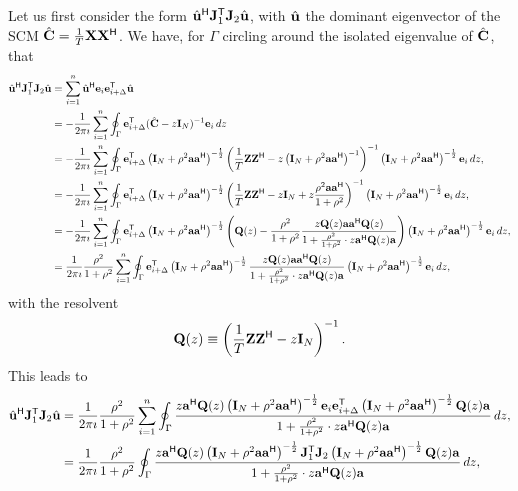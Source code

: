 \documentclass[11pt,a4paper]{article}
\begin{document}
Let us first consider the form $\hat {\mathbf{u}}^{\sf H} {\mathbf{J}}_1^{\sf T} {\mathbf{J}}_2 \hat {\mathbf{u}}$, with $\hat {\mathbf{u}}$ the dominant eigenvector of the SCM $\hat {{\mathbf{C}}} = \frac1T {\mathbf{X}} {\mathbf{X}}^{\sf H}$.
We have, for $\Gamma$ circling around the isolated eigenvalue of $\hat {{\mathbf{C}}}$, that
\begin{align*}
		\hat {\mathbf{u}}^{\sf H} {\mathbf{J}}_1^{\sf T} {\mathbf{J}}_2 \hat {\mathbf{u}} &= \sum_{i=1}^n \hat {\mathbf{u}}^{\sf H} \mathbf{e}_{i} \mathbf{e}_{i + \Delta}^{\sf T} \hat {\mathbf{u}} \\ 
		&= -\frac1{2 \pi \imath} \sum_{i=1}^n \oint_{\Gamma} \mathbf{e}_{i + \Delta}^{\sf T} ( \hat {{\mathbf{C}}} - z \mathbf{I}_N )^{-1} \mathbf{e}_{i}\,dz \\ 
		&= -\frac1{2 \pi \imath} \sum_{i=1}^n \oint_{\Gamma} \mathbf{e}_{i + \Delta}^{\sf T} \left(\mathbf{I}_N + \rho^2 \mathbf{a} \mathbf{a}^{\sf H} \right)^{-\frac12} \left( \frac1T {\mathbf{Z}} {\mathbf{Z}}^{\sf H} - z  \left(\mathbf{I}_N + \rho^2 \mathbf{a} \mathbf{a}^{\sf H} \right)^{-1} \right)^{-1} \left(\mathbf{I}_N + \rho^2 \mathbf{a} \mathbf{a}^{\sf H} \right)^{-\frac12} \mathbf{e}_{i}\,dz, \\ 
		&= -\frac1{2 \pi \imath} \sum_{i=1}^n \oint_{\Gamma} \mathbf{e}_{i + \Delta}^{\sf T} \left(\mathbf{I}_N + \rho^2 \mathbf{a} \mathbf{a}^{\sf H} \right)^{-\frac12} \left( \frac1T {\mathbf{Z}} {\mathbf{Z}}^{\sf H} - z \mathbf{I}_N + z \frac{ \rho^2 \mathbf{a} \mathbf{a}^{\sf H} }{1 + \rho^2} \right)^{-1} \left(\mathbf{I}_N + \rho^2 \mathbf{a} \mathbf{a}^{\sf H} \right)^{-\frac12} \mathbf{e}_{i}\,dz, \\ 
		&= -\frac1{2 \pi \imath} \sum_{i=1}^n \oint_{\Gamma} \mathbf{e}_{i + \Delta}^{\sf T} \left(\mathbf{I}_N + \rho^2 \mathbf{a} \mathbf{a}^{\sf H} \right)^{-\frac12} \left( {\mathbf{Q}}(z) -  \frac{ \rho^2 }{1 + \rho^2} \frac{z {\mathbf{Q}}(z) \mathbf{a} \mathbf{a}^{\sf H} {\mathbf{Q}}(z)}{ 1 + \frac{ \rho^2 }{1 + \rho^2} \cdot z \mathbf{a}^{\sf H} {\mathbf{Q}}(z) \mathbf{a} } \right) \left(\mathbf{I}_N + \rho^2 \mathbf{a} \mathbf{a}^{\sf H} \right)^{-\frac12} \mathbf{e}_{i}\,dz, \\ 
		&= \frac1{2 \pi \imath} \frac{ \rho^2 }{1 + \rho^2} \sum_{i=1}^n \oint_{\Gamma} \mathbf{e}_{i + \Delta}^{\sf T} \left(\mathbf{I}_N + \rho^2 \mathbf{a} \mathbf{a}^{\sf H} \right)^{-\frac12} \frac{z {\mathbf{Q}}(z) \mathbf{a} \mathbf{a}^{\sf H} {\mathbf{Q}}(z)}{ 1 + \frac{ \rho^2 }{1 + \rho^2} \cdot z \mathbf{a}^{\sf H} {\mathbf{Q}}(z) \mathbf{a} } \left(\mathbf{I}_N + \rho^2 \mathbf{a} \mathbf{a}^{\sf H} \right)^{-\frac12} \mathbf{e}_{i}\,dz,
\end{align*}
with the resolvent
\begin{equation}
	{\mathbf{Q}}(z) \equiv \left( \frac1T {\mathbf{Z}} {\mathbf{Z}}^{\sf H} - z \mathbf{I}_N \right)^{-1}.
\end{equation}
This leads to 
\begin{align*}
		\hat {\mathbf{u}}^{\sf H} {\mathbf{J}}_1^{\sf T} {\mathbf{J}}_2 \hat {\mathbf{u}}  
		&= \frac1{2 \pi \imath} \frac{ \rho^2 }{1 + \rho^2} \sum_{i=1}^n \oint_{\Gamma} \frac{z \mathbf{a}^{\sf H} {\mathbf{Q}}(z) \left(\mathbf{I}_N + \rho^2 \mathbf{a} \mathbf{a}^{\sf H} \right)^{-\frac12} \mathbf{e}_{i} \mathbf{e}_{i + \Delta}^{\sf T} \left(\mathbf{I}_N + \rho^2 \mathbf{a} \mathbf{a}^{\sf H} \right)^{-\frac12} {\mathbf{Q}}(z) \mathbf{a} }{ 1 + \frac{ \rho^2 }{1 + \rho^2} \cdot z \mathbf{a}^{\sf H} {\mathbf{Q}}(z) \mathbf{a} }\,dz, \\ 
		&= \frac1{2 \pi \imath} \frac{ \rho^2 }{1 + \rho^2} \oint_{\Gamma} \frac{z \mathbf{a}^{\sf H} {\mathbf{Q}}(z) \left(\mathbf{I}_N + \rho^2 \mathbf{a} \mathbf{a}^{\sf H} \right)^{-\frac12} {\mathbf{J}}_1^{\sf T} {\mathbf{J}}_2 \left(\mathbf{I}_N + \rho^2 \mathbf{a} \mathbf{a}^{\sf H} \right)^{-\frac12} {\mathbf{Q}}(z) \mathbf{a} }{ 1 + \frac{ \rho^2 }{1 + \rho^2} \cdot z \mathbf{a}^{\sf H} {\mathbf{Q}}(z) \mathbf{a} }\,dz,
\end{align*}
\end{document}
